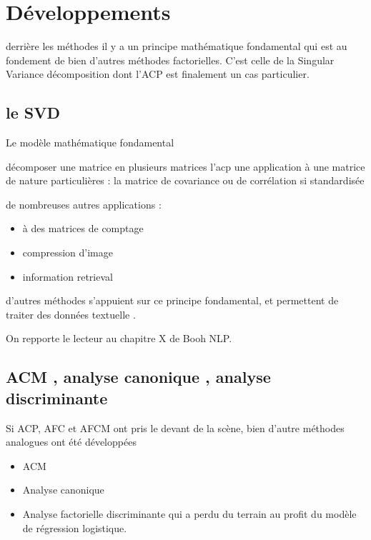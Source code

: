 \documentclass[
]{book}
\providecommand{\tightlist}{%
  \setlength{\itemsep}{0pt}\setlength{\parskip}{0pt}}
\begin{document}
\hypertarget{duxe9veloppements}{%
\section{Développements}\label{duxe9veloppements}}

derrière les méthodes il y a un principe mathématique fondamental qui est au fondement de bien d'autres méthodes factorielles. C'est celle de la Singular Variance décomposition dont l'ACP est finalement un cas particulier.

\hypertarget{le-svd}{%
\subsection{le SVD}\label{le-svd}}

Le modèle mathématique fondamental

décomposer une matrice en plusieurs matrices
l'acp une application à une matrice de nature particulières : la matrice de covariance ou de corrélation si standardisée

de nombreuses autres applications :

\begin{itemize}
\tightlist
\item
  à des matrices de comptage
\item
  compression d'image
\item
  information retrieval
\end{itemize}

d'autres méthodes s'appuient sur ce principe fondamental, et permettent de traiter des données textuelle .

On repporte le lecteur au chapitre X de Booh NLP.

\hypertarget{acm-analyse-canonique-analyse-discriminante}{%
\subsection{ACM , analyse canonique , analyse discriminante}\label{acm-analyse-canonique-analyse-discriminante}}

Si ACP, AFC et AFCM ont pris le devant de la scène, bien d'autre méthodes analogues ont été développées

\begin{itemize}
\tightlist
\item
  ACM
\item
  Analyse canonique
\item
  Analyse factorielle discriminante qui a perdu du terrain au profit du modèle de régression logistique.
\end{itemize}
\end{document}
